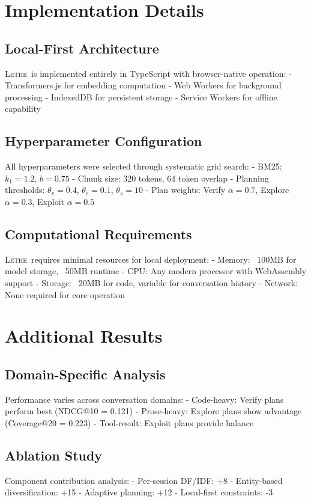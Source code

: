 \documentclass[letterpaper]{article}
\newcommand{\lethe}{\textsc{Lethe}}
\begin{document}
\newpage
\appendix

\section{Implementation Details}

\subsection{Local-First Architecture}

\lethe\ is implemented entirely in TypeScript with browser-native operation:
- Transformers.js for embedding computation
- Web Workers for background processing  
- IndexedDB for persistent storage
- Service Workers for offline capability

\subsection{Hyperparameter Configuration}

All hyperparameters were selected through systematic grid search:
- BM25: $k_1 = 1.2$, $b = 0.75$  
- Chunk size: 320 tokens, 64 token overlap
- Planning thresholds: $\theta_v = 0.4$, $\theta_e = 0.1$, $\theta_s = 10$
- Plan weights: Verify $\alpha = 0.7$, Explore $\alpha = 0.3$, Exploit $\alpha = 0.5$

\subsection{Computational Requirements}

\lethe\ requires minimal resources for local deployment:
- Memory: ~100MB for model storage, ~50MB runtime
- CPU: Any modern processor with WebAssembly support
- Storage: ~20MB for code, variable for conversation history
- Network: None required for core operation

\section{Additional Results}

\subsection{Domain-Specific Analysis}

Performance varies across conversation domains:
- Code-heavy: Verify plans perform best (NDCG@10 = 0.121)
- Prose-heavy: Explore plans show advantage (Coverage@20 = 0.223)
- Tool-result: Exploit plans provide balance

\subsection{Ablation Study}

Component contribution analysis:
- Per-session DF/IDF: +8%
- Entity-based diversification: +15%
- Adaptive planning: +12%
- Local-first constraints: -3%
\end{document}
